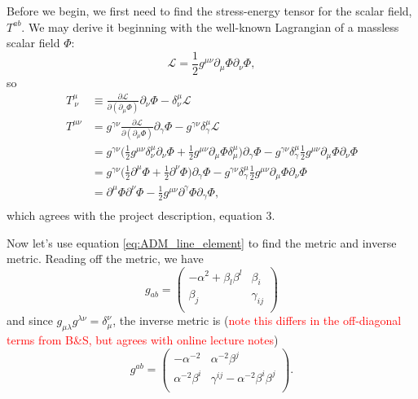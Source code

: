 \documentclass[12pt]{article}
\numberwithin{equation}{section}
\newcommand{\Lagr}{\mathcal{L}}
\newcommand{\redtext}[1]{\textcolor{red}{#1}}
\begin{document}
Before we begin, we first need to find the stress-energy tensor for the scalar field, $T^{ab}$.  We may derive it beginning with the well-known Lagrangian of a massless scalar field $\Phi$:
\begin{equation}
\Lagr = \frac{1}{2} g^{\mu \nu} \partial_\mu \Phi \partial_\nu \Phi,
\end{equation}
so
\begin{equation}
\begin{aligned}
T^{\mu}_{~\nu} &\equiv \frac{\partial \Lagr}{\partial (\partial_\mu \Phi)} \partial_\nu \Phi - \delta^\mu_\nu \Lagr \\
T^{\mu \nu} &= g^{\gamma \nu} \frac{\partial \Lagr}{\partial (\partial_\mu \Phi)} \partial_\gamma \Phi - g^{\gamma \nu} \delta^\mu_\gamma \Lagr \\
&= g^{\gamma \nu} \Big( \frac{1}{2} g^{\mu \nu} \delta^\mu_\nu \partial_\nu \Phi + \frac{1}{2} g^{\mu \nu} \partial_\mu \Phi \delta^\mu_\mu \Big) \partial_\gamma \Phi	 - g^{\gamma \nu} \delta^\mu_\gamma \frac{1}{2} g^{\mu \nu} \partial_\mu \Phi \partial_\nu \Phi \\
&= g^{\gamma \nu} \Big( \frac{1}{2} \partial^\mu \Phi + \frac{1}{2} \partial^\nu \Phi \Big) \partial_\gamma \Phi - g^{\gamma \nu} \delta^\mu_\gamma \frac{1}{2} g^{\mu \nu} \partial_\mu \Phi \partial_\nu \Phi \\
&= \partial^\mu \Phi \partial^\nu \Phi - \frac{1}{2} g^{\mu \nu} \partial^\gamma \Phi \partial_\gamma \Phi, \\
\end{aligned}
\end{equation}
which agrees with the project description, equation 3.

Now let's use equation \ref{eq:ADM_line_element} to find the metric and inverse metric.  Reading off the metric, we have
\begin{equation}
g_{ab} =
\begin{pmatrix}
-\alpha^{2} + \beta_l \beta^l & \beta_i \\
\beta_j & \gamma_{ij}  \\
\end{pmatrix}
\end{equation}
and since $g_{\mu \lambda} g^{\lambda \nu} = \delta^\nu_\mu$, the inverse metric is (\redtext{note this differs in the off-diagonal terms from B\&S, but agrees with online lecture notes})
\begin{equation}
g^{ab} = 
\begin{pmatrix}
-\alpha^{-2} & \alpha^{-2} \beta^j \\
\alpha^{-2} \beta^i & \gamma^{ij} - \alpha^{-2} \beta^{i} \beta^{j} \\
\end{pmatrix}.
\end{equation}
\end{document}
